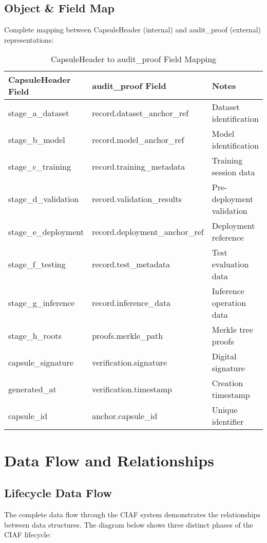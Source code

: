 \documentclass[12pt,a4paper]{article}
\begin{document}
\subsection{Object \& Field Map}

Complete mapping between CapsuleHeader (internal) and audit\_proof (external) representations:

\begin{table}[H]
\centering
\caption{CapsuleHeader to audit\_proof Field Mapping}
\begin{tabular}{|l|l|l|}
\hline
\textbf{CapsuleHeader Field} & \textbf{audit\_proof Field} & \textbf{Notes} \\
\hline
stage\_a\_dataset & record.dataset\_anchor\_ref & Dataset identification \\
stage\_b\_model & record.model\_anchor\_ref & Model identification \\
stage\_c\_training & record.training\_metadata & Training session data \\
stage\_d\_validation & record.validation\_results & Pre-deployment validation \\
stage\_e\_deployment & record.deployment\_anchor\_ref & Deployment reference \\
stage\_f\_testing & record.test\_metadata & Test evaluation data \\
stage\_g\_inference & record.inference\_data & Inference operation data \\
stage\_h\_roots & proofs.merkle\_path & Merkle tree proofs \\
capsule\_signature & verification.signature & Digital signature \\
generated\_at & verification.timestamp & Creation timestamp \\
capsule\_id & anchor.capsule\_id & Unique identifier \\
\hline
\end{tabular}
\end{table}

\section{Data Flow and Relationships}

\subsection{Lifecycle Data Flow}

The complete data flow through the CIAF system demonstrates the relationships between data structures. The diagram below shows three distinct phases of the CIAF lifecycle:
\end{document}
